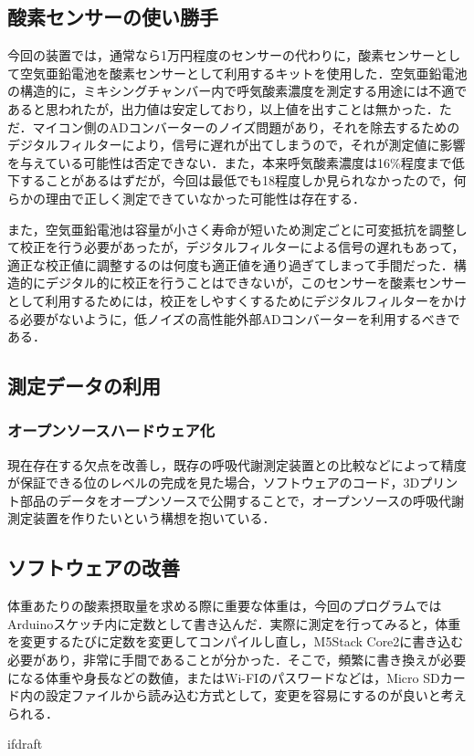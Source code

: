 \subsection{酸素センサーの使い勝手}

今回の装置では，通常なら1万円程度のセンサーの代わりに，酸素センサーとして空気亜鉛電池を酸素センサーとして利用するキットを使用した．空気亜鉛電池の構造的に，ミキシングチャンバー内で呼気酸素濃度を測定する用途には不適であると思われたが，出力値は安定しており，以上値を出すことは無かった．ただ．マイコン側のADコンバーターのノイズ問題があり，それを除去するためのデジタルフィルターにより，信号に遅れが出てしまうので，それが測定値に影響を与えている可能性は否定できない．また，本来呼気酸素濃度は16\%程度まで低下することがあるはずだが，今回は最低でも18\％程度しか見られなかったので，何らかの理由で正しく測定できていなかった可能性は存在する．

また，空気亜鉛電池は容量が小さく寿命が短いため測定ごとに可変抵抗を調整して校正を行う必要があったが，デジタルフィルターによる信号の遅れもあって，適正な校正値に調整するのは何度も適正値を通り過ぎてしまって手間だった．構造的にデジタル的に校正を行うことはできないが，このセンサーを酸素センサーとして利用するためには，校正をしやすくするためにデジタルフィルターをかける必要がないように，低ノイズの高性能外部ADコンバーターを利用するべきである．

\subsection{測定データの利用}

\subsubsection{オープンソースハードウェア化}

現在存在する欠点を改善し，既存の呼吸代謝測定装置との比較などによって精度が保証できる位のレベルの完成を見た場合，ソフトウェアのコード，3Dプリント部品のデータをオープンソースで公開することで，オープンソースの呼吸代謝測定装置を作りたいという構想を抱いている．

\subsection{ソフトウェアの改善}

体重あたりの酸素摂取量を求める際に重要な体重は，今回のプログラムではArduinoスケッチ内に定数として書き込んだ．実際に測定を行ってみると，体重を変更するたびに定数を変更してコンパイルし直し，M5Stack Core2に書き込む必要があり，非常に手間であることが分かった．そこで，頻繁に書き換えが必要になる体重や身長などの数値，またはWi-FIのパスワードなどは，Micro SDカード内の設定ファイルから読み込む方式として，変更を容易にするのが良いと考えられる．

\expandafter\ifx\csname ifdraft\endcsname\relax
  
\fi
